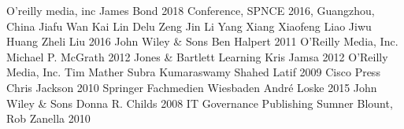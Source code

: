 \documentclass{article}
\begin{document}
\begin{thebibliography}{9}
        O'reilly media, inc
        James Bond
        2018
        Conference, SPNCE 2016, Guangzhou, China
        Jiafu Wan
        Kai Lin
        Delu Zeng
        Jin Li
        Yang Xiang
        Xiaofeng Liao
        Jiwu Huang
        Zheli Liu
        2016
        John Wiley \& Sons
        Ben Halpert
        2011
        O'Reilly Media, Inc.
        Michael P. McGrath
        2012
        Jones \& Bartlett Learning
        Kris Jamsa
        2012
        O'Reilly Media, Inc.
        Tim Mather
        Subra Kumaraswamy
        Shahed Latif
        2009
        Cisco Press
        Chris Jackson
        2010
        Springer Fachmedien Wiesbaden
        André Loske
        2015
        John Wiley \& Sons
        Donna R. Childs
        2008
        IT Governance Publishing
        Sumner Blount, Rob Zanella
        2010

\end{thebibliography}
\end{document}

